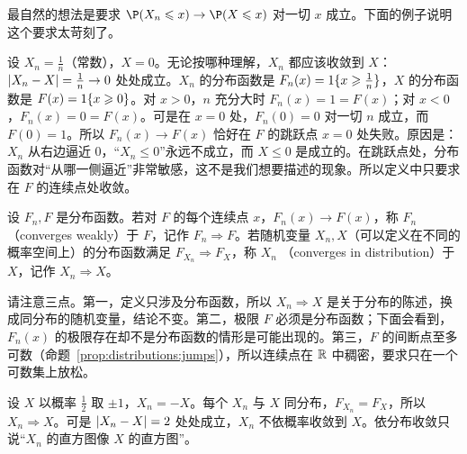 最自然的想法是要求 $\P(X_n\leqslant x)\to \P(X\leqslant x)$ 对一切 $x$ 成立。下面的例子说明这个要求太苛刻了。

\begin{example}[为什么只要求在连续点处收敛]\label{ex:convergence:why-continuity}
设 $X_n=\frac1n$（常数），$X=0$。无论按哪种理解，$X_n$ 都应该收敛到 $X$：$\lvert X_n-X\rvert=\frac1n\to0$ 处处成立。$X_n$ 的分布函数是 $F_n(x)=1\{x\geqslant\frac1n\}$，$X$ 的分布函数是 $F(x)=1\{x\geqslant0\}$。对 $x>0$，$n$ 充分大时 $F_n(x)=1=F(x)$；对 $x<0$，$F_n(x)=0=F(x)$。可是在 $x=0$ 处，$F_n(0)=0$ 对一切 $n$ 成立，而 $F(0)=1$。所以 $F_n(x)\to F(x)$ 恰好在 $F$ 的跳跃点 $x=0$ 处失败。原因是：$X_n$ 从右边逼近 $0$，“$X_n\leqslant0$”永远不成立，而 $X\leqslant0$ 是成立的。在跳跃点处，分布函数对“从哪一侧逼近”非常敏感，这不是我们想要描述的现象。所以定义中只要求在 $F$ 的连续点处收敛。
\end{example}

\begin{definition}[依分布收敛]\label{def:convergence:distribution}
设 $F_n,F$ 是分布函数。若对 $F$ 的每个连续点 $x$，$F_n(x)\to F(x)$，称 $F_n$ （converges weakly）于 $F$，记作 $F_n\Rightarrow F$。若随机变量 $X_n,X$（可以定义在不同的概率空间上）的分布函数满足 $F_{X_n}\Rightarrow F_X$，称 $X_n$ （converges in distribution）于 $X$，记作 $X_n\Rightarrow X$。
\end{definition}

请注意三点。第一，定义只涉及分布函数，所以 $X_n\Rightarrow X$ 是关于分布的陈述，换成同分布的随机变量，结论不变。第二，极限 $F$ 必须是分布函数；下面会看到，$F_n(x)$ 的极限存在却不是分布函数的情形是可能出现的。第三，$F$ 的间断点至多可数（命题~\ref{prop:distributions:jumps}），所以连续点在 $\mathbb{R}$ 中稠密，要求只在一个可数集上放松。

\begin{example}[依分布收敛完全不管值]\label{ex:convergence:minus-X}
设 $X$ 以概率 $\frac12$ 取 $\pm1$，$X_n=-X$。每个 $X_n$ 与 $X$ 同分布，$F_{X_n}=F_X$，所以 $X_n\Rightarrow X$。可是 $\lvert X_n-X\rvert=2$ 处处成立，$X_n$ 不依概率收敛到 $X$。依分布收敛只说“$X_n$ 的直方图像 $X$ 的直方图”。
\end{example}

